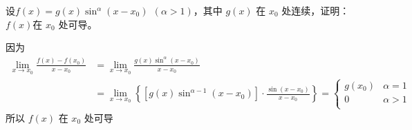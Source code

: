 \begin{problem}
设$f\left( x \right) = g\left( x \right)\sin^{\alpha}{(x - x_{0})}\ \ (\alpha > 1)$，其中
	$g\left( x \right)$ 在 $x_{0}$ 处连续，证明：
	$f\left( x \right)$在 $x_{0}$ 处可导。
	
\begin{solution}
	因为
	\begin{equation*}
	\begin{split}
	\lim_{x \rightarrow x_{0}}\frac{f(x) - f\left( x_{0} \right)}{x - x_{0}} &= \lim_{x \rightarrow x_{0}}\frac{g(x)\sin^{\alpha}\left( x - x_{0} \right)}{x - x_{0}}\\
	& = \lim_{x \rightarrow x_{0}}\left\{ \left\lbrack g(x)\sin^{\alpha - 1}\left( x - x_{0} \right) \right\rbrack \cdot \frac{\sin\left( x - x_{0} \right)}{x - x_{0}} \right\} = \left\{ \begin{matrix}
g\left( x_{0} \right) & \alpha = 1 \\
0 & \alpha > 1 \\
\end{matrix} \right.\ \ 
\end{split}
\end{equation*}
所以 $f\left( x \right)$ 在 $x_{0}$ 处可导
\end{solution}

\end{problem}


